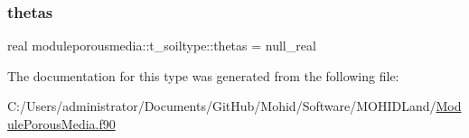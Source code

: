 \mbox{\label{structmoduleporousmedia_1_1t__soiltype_a8b6f8a9cbaa4477305d3cb682eff8287}} 
\subsubsection{\texorpdfstring{thetas}{thetas}}
{\footnotesize\ttfamily real moduleporousmedia\+::t\+\_\+soiltype\+::thetas = null\+\_\+real\hspace{0.3cm}{\ttfamily [private]}}



The documentation for this type was generated from the following file\+:\begin{DoxyCompactItemize}
\item 
C\+:/\+Users/administrator/\+Documents/\+Git\+Hub/\+Mohid/\+Software/\+M\+O\+H\+I\+D\+Land/\mbox{\hyperlink{_module_porous_media_8f90}{Module\+Porous\+Media.\+f90}}\end{DoxyCompactItemize}
